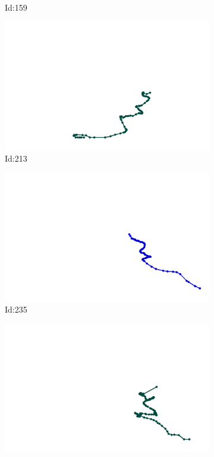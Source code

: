 \documentclass[12pt,twoside]{report}
\begin{document}
\begin{figure}
\begin{subfigure}[b]{0.20\textwidth}
\caption{Id:159}
\end{subfigure}
\begin{subfigure}[b]{0.20\textwidth}
\centering
\includegraphics[width=\textwidth]{../trajectories/213.png}
\caption{Id:213}
\end{subfigure}
\begin{subfigure}[b]{0.20\textwidth}
\centering
\includegraphics[width=\textwidth]{../trajectories/235.png}
\caption{Id:235}
\end{subfigure}
\begin{subfigure}[b]{0.20\textwidth}
\centering
\includegraphics[width=\textwidth]{../trajectories/241.png}

\end{subfigure}
\end{figure}
\end{document}
